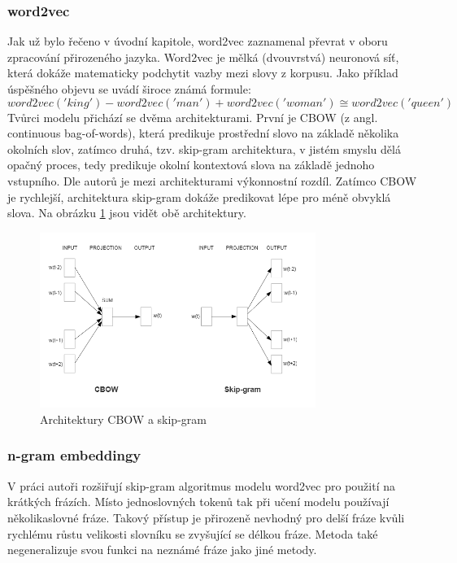 \documentclass[thesis=M,czech]{FITthesis}[2019/12/23]
\begin{document}
\subsubsection*{word2vec}
Jak už bylo řečeno v úvodní kapitole, word2vec\cite{mikolov2013} zaznamenal převrat v oboru zpracování přirozeného jazyka. Word2vec je mělká (dvouvrstvá) neuronová síť, která dokáže matematicky podchytit vazby mezi slovy z korpusu. Jako příklad úspěšného objevu se uvádí široce známá formule:
\begin{equation}
word2vec('king' ) - word2vec('man' ) + word2vec('woman' ) \cong word2vec('queen')
\end{equation}
Tvůrci modelu přichází se dvěma architekturami. První je CBOW (z angl. continuous bag-of-words), která predikuje prostřední slovo na základě několika okolních slov, zatímco druhá, tzv. skip-gram architektura, v jistém smyslu dělá opačný proces, tedy predikuje okolní kontextová slova na základě jednoho vstupního. Dle autorů je mezi architekturami výkonnostní rozdíl. Zatímco CBOW je rychlejší, architektura skip-gram dokáže predikovat lépe pro méně obvyklá slova\cite{mikolov2013}.
 Na obrázku \ref{fig:mikolov2013word2vec} jsou vidět obě architektury.
\begin{figure}\centering
	\includegraphics[width=0.8\textwidth]{images/mikolov2013_word2vec.png}
	\caption{Architektury CBOW a skip-gram\cite{mikolov2013}}\label{fig:mikolov2013word2vec}
\end{figure}

\newpage
\subsubsection*{n-gram embeddingy}
V práci \cite{mikolov2013b} autoři rozšiřují skip-gram algoritmus modelu word2vec pro použití na krátkých frázích. Místo jednoslovných tokenů tak při učení modelu používají několikaslovné fráze. Takový přístup je přirozeně nevhodný pro delší fráze kvůli rychlému růstu velikosti slovníku se zvyšující se délkou fráze. Metoda také negeneralizuje svou funkci na neznámé fráze jako jiné metody.
\end{document}
